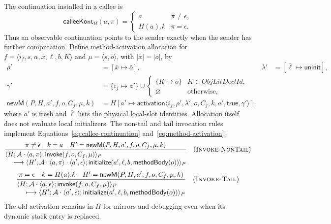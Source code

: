 \documentclass[11pt]{article}
\numberwithin{equation}{section}
\newcommand{\kw}[1]{\ensuremath{\mathsf{#1}}}
\newcommand{\rulelabel}[1]{\textsc{#1}}
\begin{document}
The continuation installed in a callee is
\begin{equation}\label{eq:callee-continuation}
 \mathsf{calleeKont}_H(a,\pi)=
 \begin{cases}a&\pi\ne\epsilon,\\H(a).k&\pi=\epsilon.\end{cases}
\end{equation}
Thus an observable continuation points to the sender exactly when the sender
has further computation.  Define method-activation allocation for
$f=\langle i_f,s,\alpha,\bar x,\ell,b,K\rangle$ and
$\mu=\langle s,\bar o\rangle$, with $|\bar x|=|\bar o|$, by
\begin{equation}\label{eq:method-activation}
\begin{aligned}
 \rho'&=[\bar x\mapsto\bar o],&
 \lambda'&=[\bar\ell\mapsto\kw{uninit}],\\
 \gamma'&=\{i_f\mapsto a'\}\cup
   \begin{cases}\{K\mapsto o\}&K\in\mathit{ObjLitDeclId},\\
                 \varnothing&\text{otherwise,}\end{cases}\\
 \mathsf{newM}(P,H,a',f,o,C_f,\mu,k)
   &=H[a'\mapsto\kw{activation}\langle
       i_f,\rho',\lambda',o,C_f,k,a',\kw{true},\gamma'\rangle].
\end{aligned}
\end{equation}
where $a'$ is fresh and $\bar\ell$ lists the physical local-slot identities.
Allocation itself does not evaluate local initializers.  The non-tail and tail
invocation rules implement Equations~\eqref{eq:callee-continuation}
and~\eqref{eq:method-activation}:
\[
\dfrac{\pi\ne\epsilon\quad k=a\quad
       H'=\mathsf{newM}(P,H,a',f,o,C_f,\mu,k)}
 {\begin{aligned}
  &\langle H;\mathcal A\cdot\langle a,\pi\rangle;
      \kw{invoke}(f,o,C_f,\mu)\rangle_P\\[-1mm]
  &\quad\longmapsto
   \langle H';\mathcal A\cdot\langle a,\pi\rangle
                    \cdot\langle a',\epsilon\rangle;
      \kw{initialize}(a',\ell,b,\kw{methodBody}(o))\rangle_P
  \end{aligned}}
\quad(\rulelabel{Invoke-NonTail})
\]
\[
\dfrac{\pi=\epsilon\quad k=H(a).k\quad
       H'=\mathsf{newM}(P,H,a',f,o,C_f,\mu,k)}
 {\begin{aligned}
  &\langle H;\mathcal A\cdot\langle a,\epsilon\rangle;
      \kw{invoke}(f,o,C_f,\mu)\rangle_P\\[-1mm]
  &\quad\longmapsto
   \langle H';\mathcal A\cdot\langle a',\epsilon\rangle;
      \kw{initialize}(a',\ell,b,\kw{methodBody}(o))\rangle_P
  \end{aligned}}
\quad(\rulelabel{Invoke-Tail})
\]
The old activation remains in $H$ for mirrors and debugging even when its
dynamic stack entry is replaced.
\end{document}
